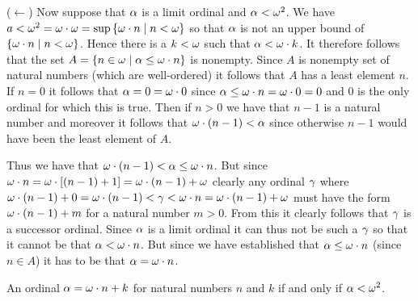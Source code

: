 {{    ($\leftarrow$) Now suppose that $\alpha$ is a limit ordinal and $\alpha < \omega^2$.
    We have $a < \omega^2 = \omega \cdot \omega = \sup\left\{ \omega \cdot n \mid n < \omega \right\}$ so that $\alpha$ is not an upper bound of $\left\{ \omega \cdot n \mid n < \omega \right\}$.
    Hence there is a $k < \omega$ such that $\alpha < \omega \cdot k$.
    It therefore follows that the set $A = \left\{ n \in \omega \mid \alpha \leq \omega \cdot n \right\}$ is nonempty.
    Since $A$ is nonempty set of natural numbers (which are well-ordered) it follows that $A$ has a least element $n$.
    If $n=0$ it follows that $\alpha = 0 = \omega \cdot 0$ since $\alpha \leq \omega \cdot n = \omega \cdot 0 = 0$ and $0$ is the only ordinal for which this is true.
    Then if $n > 0$ we have that $n-1$ is a natural number and moreover it follows that $\omega \cdot (n-1) < \alpha$ since otherwise $n-1$ would have been the least element of $A$.

    Thus we have that $\omega \cdot (n-1) < \alpha \leq \omega \cdot n$.
    But since $\omega \cdot n = \omega \cdot\left[ (n-1) + 1 \right] = \omega \cdot (n-1) + \omega$ clearly any ordinal $\gamma$ where $\omega \cdot (n-1) + 0 = \omega \cdot (n-1) < \gamma < \omega \cdot n = \omega \cdot (n-1) + \omega$ must have the form $\omega \cdot (n-1) + m$ for a natural number $m > 0$.
    From this it clearly follows that $\gamma$ is a successor ordinal.
    Since $\alpha$ is a limit ordinal it can thus not be such a $\gamma$ so that it cannot be that $\alpha < \omega \cdot n$.
    But since we have established that $\alpha \leq \omega \cdot n$ (since $n \in A$) it has to be that $\alpha = \omega \cdot n$.
  }

  \begin{lem}\label{lem:ord:w2form}
    An ordinal $\alpha = \omega \cdot n + k$ for natural numbers $n$ and $k$ if and only if $\alpha < \omega^2$.
  \end{lem}
  }
